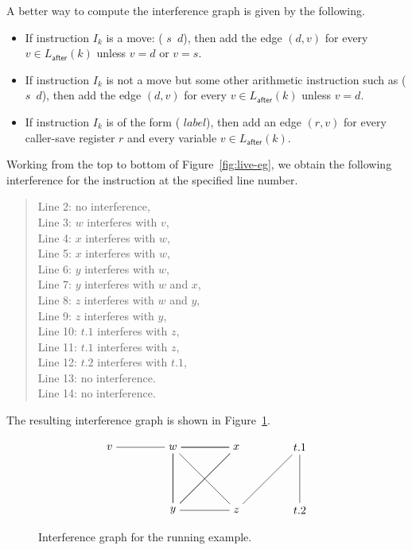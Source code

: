 \documentclass[11pt]{book}
\begin{document}
A better way to compute the interference graph is given by the
following.

\begin{itemize}
\item If instruction $I_k$ is a move: ( $s$\, $d$), then add
  the edge $(d,v)$ for every $v \in L_{\mathsf{after}}(k)$ unless $v =
  d$ or $v = s$.

\item If instruction $I_k$ is not a move but some other arithmetic
  instruction such as ( $s$\, $d$), then add the edge $(d,v)$
  for every $v \in L_{\mathsf{after}}(k)$ unless $v = d$.
  
\item If instruction $I_k$ is of the form (
  $\mathit{label}$), then add an edge $(r,v)$ for every caller-save
  register $r$ and every variable $v \in L_{\mathsf{after}}(k)$.
\end{itemize}

Working from the top to bottom of Figure~\ref{fig:live-eg}, we obtain
the following interference for the instruction at the specified line
number.
\begin{quote}
Line 2: no interference,\\
Line 3: $w$ interferes with $v$,\\
Line 4: $x$ interferes with $w$,\\
Line 5: $x$ interferes with $w$,\\
Line 6: $y$ interferes with $w$,\\
Line 7: $y$ interferes with $w$ and $x$,\\
Line 8: $z$ interferes with $w$ and $y$,\\
Line 9: $z$ interferes with $y$, \\
Line 10: $t.1$ interferes with $z$, \\
Line 11: $t.1$ interferes with $z$, \\
Line 12: $t.2$ interferes with $t.1$, \\
Line 13: no interference. \\
Line 14: no interference. 
\end{quote}
The resulting interference graph is shown in
Figure~\ref{fig:interfere}. 

\begin{figure}[tbp]
\large
\[
\begin{tikzpicture}[baseline=(current  bounding  box.center)]
\node (v) at (0,0)   {$v$};
\node (w) at (2,0)   {$w$};
\node (x) at (4,0)   {$x$};
\node (t1) at (6,0)   {$t.1$};
\node (y) at (2,-2)  {$y$};
\node (z) at (4,-2)  {$z$};
\node (t2) at (6,-2) {$t.2$};

\draw (v) to (w);
\foreach \i in {w,x,y} 
{
  \foreach \j in {w,x,y}
  { 
    \draw (\i) to (\j);
  }
}
\draw (z) to (w);
\draw (z) to (y);
\draw (t1) to (z);
\draw (t2) to (t1);
\end{tikzpicture}
\]
\caption{Interference graph for the running example.}
\label{fig:interfere}
\end{figure}
\end{document}
